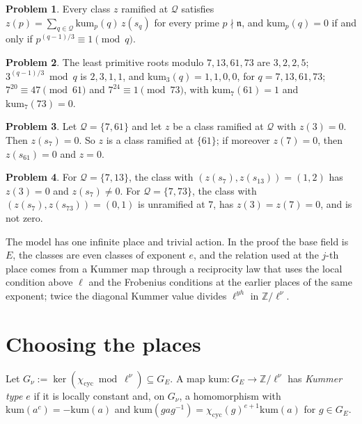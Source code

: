 \documentclass[reqno]{amsart}
\theoremstyle{definition}
\newtheorem{problem}{Problem}[section]
\theoremstyle{plain}
\newcommand{\Z}{\mathbb{Z}}
\newcommand{\cyc}{\chi_{\mathrm{cyc}}}
\begin{document}
\begin{problem}\label{pr:toy-reciprocity}
Every class \(z\) ramified at \(\mathcal Q\) satisfies \(z(p) = \sum_{q \in \mathcal Q} \mathrm{kum}_p(q)\,z(s_q)\) for every prime \(p \nmid \mathfrak n\), and \(\mathrm{kum}_p(q) = 0\) if and only if \(p^{(q-1)/3} \equiv 1 \pmod q\).
\end{problem}



\begin{problem}\label{pr:toy-table}
The least primitive roots modulo \(7, 13, 61, 73\) are \(3, 2, 2, 5\); \(3^{(q-1)/3} \bmod q\) is \(2, 3, 1, 1\), and \(\mathrm{kum}_3(q) = 1, 1, 0, 0\), for \(q = 7, 13, 61, 73\); \(7^{20} \equiv 47 \pmod{61}\) and \(7^{24} \equiv 1 \pmod{73}\), with \(\mathrm{kum}_7(61) = 1\) and \(\mathrm{kum}_7(73) = 0\).
\end{problem}

\begin{problem}\label{pr:toy-triangle}
Let \(\mathcal Q = \{7, 61\}\) and let \(z\) be a class ramified at \(\mathcal Q\) with \(z(3) = 0\).  Then \(z(s_7) = 0\).  So \(z\) is a class ramified at \(\{61\}\); if moreover \(z(7) = 0\), then \(z(s_{61}) = 0\) and \(z = 0\).
\end{problem}

\begin{problem}\label{pr:toy-failure}
For \(\mathcal Q = \{7, 13\}\), the class with \((z(s_7), z(s_{13})) = (1, 2)\) has \(z(3) = 0\) and \(z(s_7) \ne 0\).  For \(\mathcal Q = \{7, 73\}\), the class with \((z(s_7), z(s_{73})) = (0, 1)\) is unramified at \(7\), has \(z(3) = z(7) = 0\), and is not zero.
\end{problem}

The model has one infinite place and trivial action.  In the proof the base field is \(E\), the classes are even classes of exponent \(e\), and the relation used at the \(j\)-th place comes from a Kummer map through a reciprocity law that uses the local condition above \(\ell\) and the Frobenius conditions at the earlier places of the same exponent; twice the diagonal Kummer value divides \(\ell^{yh}\) in \(\Z/\ell^\nu\).

\section{Choosing the places}\label{sec:choice}

Let \(G_\nu := \ker(\cyc \bmod \ell^\nu) \subseteq G_E\).  A map \(\mathrm{kum} \colon G_E \to \Z/\ell^\nu\) has \emph{Kummer type \(e\)} if it is locally constant and, on \(G_\nu\), a homomorphism with \(\mathrm{kum}(a^c) = -\mathrm{kum}(a)\) and \(\mathrm{kum}(gag^{-1}) = \cyc(g)^{e+1}\mathrm{kum}(a)\) for \(g \in G_E\).
\end{document}

